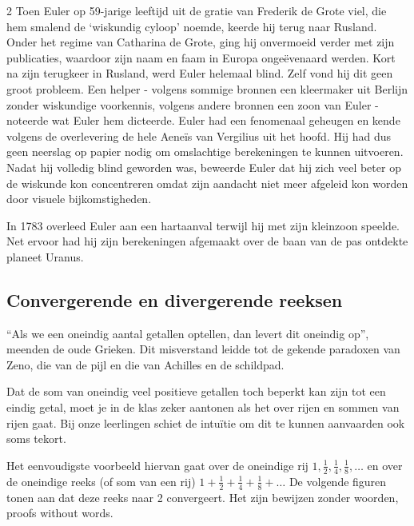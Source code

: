 \begin{multicols}{2}
	Toen Euler op 59-jarige leeftijd uit de gratie van Frederik de Grote viel, die hem smalend de `wiskundig cyloop' noemde, keerde hij terug naar Rusland. Onder het regime van Catharina de Grote, ging hij onvermoeid verder met zijn publicaties, waardoor zijn naam en faam in Europa ongeëvenaard werden. Kort na zijn terugkeer in Rusland, werd Euler helemaal blind. Zelf vond hij dit geen groot probleem. Een helper - volgens sommige bronnen een kleermaker uit Berlijn zonder wiskundige voorkennis, volgens andere bronnen een zoon van Euler - noteerde wat Euler hem dicteerde. Euler had een fenomenaal geheugen en kende volgens de overlevering de hele Aeneïs van Vergilius uit het hoofd. Hij had dus geen neerslag op papier nodig om omslachtige berekeningen te kunnen uitvoeren. Nadat hij volledig blind geworden was, beweerde Euler dat hij zich veel beter op de wiskunde kon concentreren omdat zijn aandacht niet meer afgeleid kon worden door visuele bijkomstigheden. 
	
	In 1783 overleed Euler aan een hartaanval terwijl hij met zijn kleinzoon speelde. Net ervoor had hij zijn berekeningen afgemaakt over de baan van de pas ontdekte planeet Uranus.    
	
	\subsection*{Convergerende en divergerende reeksen}   
	
	``Als we een oneindig aantal getallen optellen, dan levert dit oneindig op'', meenden de oude Grieken. Dit misverstand leidde tot de gekende paradoxen van Zeno, die van de pijl en die van Achilles en de schildpad. 
	
	Dat de som van oneindig veel positieve getallen toch beperkt kan zijn tot een eindig getal, moet je in de klas zeker aantonen als het over rijen en sommen van rijen gaat. Bij onze leerlingen schiet de intuïtie om dit te kunnen aanvaarden ook soms tekort. 
	
	Het eenvoudigste voorbeeld hiervan gaat over de oneindige rij $1, \frac{1}{2}, \frac{1}{4}, \frac{1}{8}, \dots $ en over de oneindige reeks (of som van een rij) $1+ \frac{1}{2}+ \frac{1}{4}+ \frac{1}{8}+ \dots$ De volgende figuren tonen aan dat deze reeks naar 2 convergeert. Het zijn bewijzen zonder woorden, proofs without words.
	
	
	

\end{multicols}

